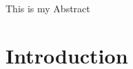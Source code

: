 \documentclass[../main.tex]{subfiles}
\makeatletter
\renewenvironment{abstract}{%
  \if@twocolumn
    \section*{\abstractname}%
  \else
    \small
    \begin{center}%
      {\bfseries \abstractname\vspace{-.5em}\vspace{\z@}}%
    \end{center}%
    \quotation
  \fi}
  {\if@twocolumn\else\endquotation\fi}
\makeatother
\begin{document}
  \begin{titlepage}
    \maketitle
  \end{titlepage}

  \begin{abstract}
    This is my Abstract
  \end{abstract}

  \newpage
  \listoffigures
  \tableofcontents

  \setlength{\parskip}{0.5em}

  \chapter{Introduction}\label{chapter:introduction}
\end{document}
